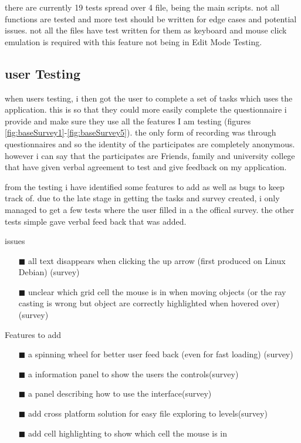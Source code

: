there are currently 19 tests spread over 4 file, being the main scripts. not all functions are tested and more test should be written for edge cases and potential issues. not all the files have test written for them as keyboard and mouse click emulation is required with this feature not being in Edit Mode Testing.


\subsection{user Testing}
when users testing, i then got the user to complete a set of tasks which uses the application. this is so that they could more easily complete the questionnaire i provide and make sure they use all the features I am testing (figures \ref{fig:baseSurvey1}-\ref{fig:baseSurvey5}). the only form of recording was through questionnaires and so the identity of the participates are completely anonymous. however i can say that the participates are Friends, family and university college that have given verbal agreement to test and give feedback on my application.

from the testing i have identified some features to add as well as bugs to keep track of. due to the late stage in getting the tasks and survey created, i only managed to get a few tests where the user filled in a the offical survey. the other tests simple gave verbal feed back that was added.

issues
\begin{enumerate}
  \item[$\blacksquare$] all text disappears when clicking the up arrow (first produced on Linux Debian) (survey)
  \item[$\blacksquare$] unclear which grid cell the mouse is in when moving objects (or the ray casting is wrong but object are correctly highlighted when hovered over)(survey)
\end{enumerate}
Features to add
\begin{enumerate}
  \item[$\blacksquare$] a spinning wheel for better user feed back (even for fast loading) (survey)
  \item[$\blacksquare$] a information panel to show the users the controls(survey)
  \item[$\blacksquare$] a panel describing how to use the interface(survey)
  \item[$\blacksquare$] add cross platform solution for easy file exploring to levels(survey)
  \item[$\blacksquare$] add cell highlighting to show which cell the mouse is in
\end{enumerate}



